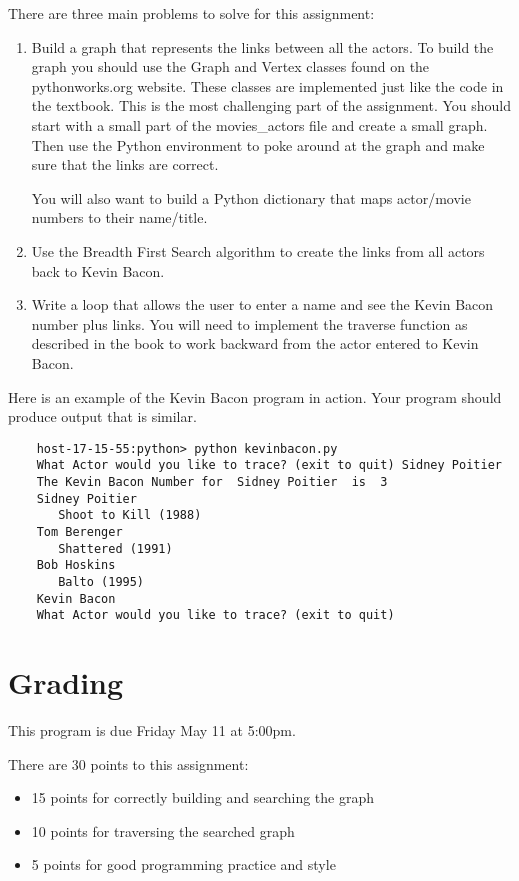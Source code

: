\documentclass[11pt]{article}
\begin{document}
There are three main problems to solve for this assignment:
\begin{enumerate}
    \item  Build a graph that represents the links between all the actors.  To build the graph you should use the Graph and Vertex classes found on the pythonworks.org website.  These classes are implemented just like the code in the textbook.  This is the most challenging part of the assignment.  You should start with a small part of the movies\_actors file and create a small graph.  Then use the Python environment to poke around at the graph and make sure that the links are correct.
    
    You will also want to build a Python dictionary that maps actor/movie numbers to their name/title.

    \item  Use the Breadth First Search algorithm to create the links from all actors back to Kevin Bacon.

    \item  Write a loop that allows the user to enter a name and see the Kevin Bacon number plus links.  You will need to implement the traverse function as described in the book to work backward from the actor entered to Kevin Bacon.
    
\end{enumerate}
Here is an example of the Kevin Bacon program in action.  Your program should produce output that is similar.
\begin{verbatim}
    host-17-15-55:python> python kevinbacon.py 
    What Actor would you like to trace? (exit to quit) Sidney Poitier
    The Kevin Bacon Number for  Sidney Poitier  is  3
    Sidney Poitier
       Shoot to Kill (1988)
    Tom Berenger
       Shattered (1991)
    Bob Hoskins
       Balto (1995)
    Kevin Bacon
    What Actor would you like to trace? (exit to quit)                              
\end{verbatim}

\section{Grading}
This program is due Friday May 11 at 5:00pm.

There are 30 points to this assignment:
\begin{itemize}
\item 15 points for correctly building and searching the graph
\item 10 points for traversing the searched graph
\item 5 points for good programming practice and style
\end{itemize}
\end{document}

